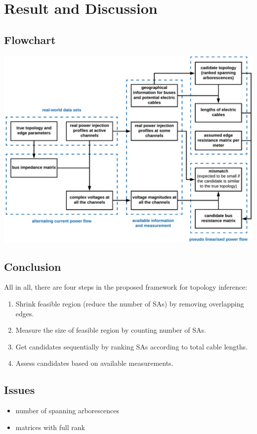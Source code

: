 \documentclass[
]{book}
\providecommand{\tightlist}{%
  \setlength{\itemsep}{0pt}\setlength{\parskip}{0pt}}
\begin{document}
\hypertarget{result-and-discussion}{%
\chapter{Result and Discussion}\label{result-and-discussion}}

\hypertarget{flowchart}{%
\section{Flowchart}\label{flowchart}}

\includegraphics{Pictures/figFlowchartRotate.png}

\hypertarget{conclusion}{%
\section{Conclusion}\label{conclusion}}

All in all, there are four steps in the proposed framework for topology inference:

\begin{enumerate}
\def\labelenumi{\arabic{enumi}.}
\tightlist
\item
  Shrink feasible region (reduce the number of SAs) by removing overlapping
  edges.
\item
  Measure the size of feasible region by counting number of SAs.
\item
  Get candidates sequentially by ranking SAs according to total cable lengths.
\item
  Assess candidates based on available measurements.
\end{enumerate}

\hypertarget{issues}{%
\section{Issues}\label{issues}}

\begin{itemize}
\tightlist
\item
  number of spanning arborescences
\item
  matrices with full rank
\end{itemize}

  
\end{document}
